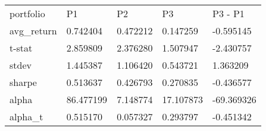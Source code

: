 \begin{tabular}{lllll}
\toprule
\midrule
portfolio & P1 & P2 & P3 & P3 - P1 \\
avg_return & 0.742404 & 0.472212 & 0.147259 & -0.595145 \\
t-stat & 2.859809 & 2.376280 & 1.507947 & -2.430757 \\
stdev & 1.445387 & 1.106420 & 0.543721 & 1.363209 \\
sharpe & 0.513637 & 0.426793 & 0.270835 & -0.436577 \\
alpha & 86.477199 & 7.148774 & 17.107873 & -69.369326 \\
alpha_t & 0.515170 & 0.057327 & 0.293797 & -0.451342 \\
\bottomrule
\end{tabular}
